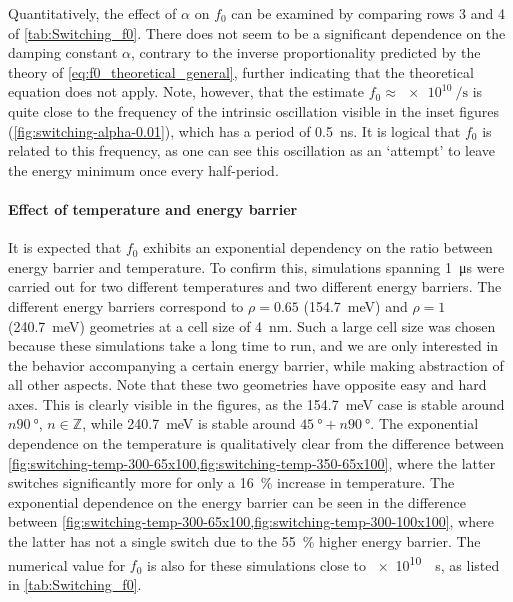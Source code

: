 \documentclass[11pt,a4paper,english]{article}
\begin{document}
Quantitatively, the effect of $\alpha$ on $f_0$ can be examined by comparing rows 3 and 4 of \cref{tab:Switching_f0}. There does not seem to be a significant dependence on the damping constant $\alpha$, contrary to the inverse proportionality predicted by the theory of \cref{eq:f0_theoretical_general}, further indicating that the theoretical equation does not apply. Note, however, that the estimate $f_0\approx\SI{e10}{\per\second}$ is quite close to the frequency of the intrinsic oscillation visible in the inset figures (\cref{fig:switching-alpha-0.01}), which has a period of \SI{0.5}{\nano\second}. It is logical that $f_0$ is related to this frequency, as one can see this oscillation as an `attempt' to leave the energy minimum once every half-period.

\FloatBarrier
\paragraph{Effect of temperature and energy barrier}
It is expected that $f_0$ exhibits an exponential dependency on the ratio between energy barrier and temperature. To confirm this, simulations spanning \SI{1}{\micro\second} were carried out for two different temperatures and two different energy barriers. The different energy barriers correspond to $\rho=0.65$ (\SI{154.7}{\milli\electronvolt}) and $\rho=1$ (\SI{240.7}{\milli\electronvolt}) geometries at a cell size of \SI{4}{\nano\metre}. Such a large cell size was chosen because these simulations take a long time to run, and we are only interested in the behavior accompanying a certain energy barrier, while making abstraction of all other aspects. Note that these two geometries have opposite easy and hard axes. This is clearly visible in the figures, as the \SI{154.7}{\milli\electronvolt} case is stable around $n\SI{90}{\degree}$, $n \in \mathbb{Z}$, while \SI{240.7}{\milli\electronvolt} is stable around $\SI{45}{\degree} + n\SI{90}{\degree}$. The exponential dependence on the temperature is qualitatively clear from the difference between \cref{fig:switching-temp-300-65x100,fig:switching-temp-350-65x100}, where the latter switches significantly more for only a \SI{16}{\percent} increase in temperature. The exponential dependence on the energy barrier can be seen in the difference between \cref{fig:switching-temp-300-65x100,fig:switching-temp-300-100x100}, where the latter has not a single switch due to the \SI{55}{\percent} higher energy barrier. The numerical value for $f_0$ is also for these simulations close to \SI{e10}{\per\second}, as listed in \cref{tab:Switching_f0}.
\end{document}
